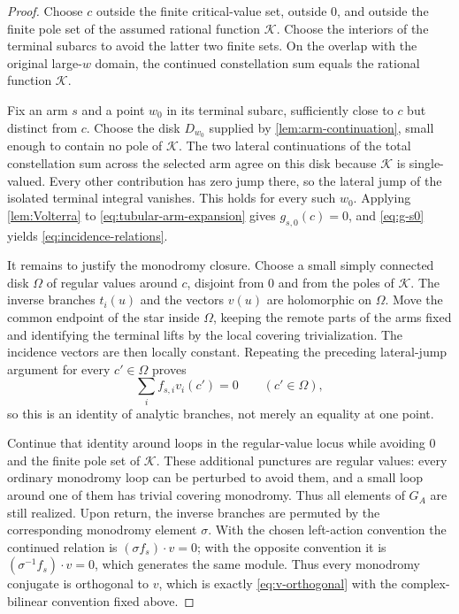 \documentclass[11pt]{article}
\numberwithin{equation}{section}
\theoremstyle{definition}
\theoremstyle{remark}
\newcommand{\Kcal}{\mathcal K}
\begin{document}
\begin{proof}
Choose $c$ outside the finite critical-value set, outside $0$, and outside
the finite pole set of the assumed rational function $\Kcal$.  Choose the
interiors of the terminal subarcs to avoid the latter two finite sets.  On
the overlap with the original large-$w$ domain, the continued constellation
sum equals the rational function $\Kcal$.

Fix an arm $s$ and a point $w_0$ in its terminal subarc, sufficiently close
to $c$ but distinct from $c$.  Choose the disk $D_{w_0}$ supplied by
\cref{lem:arm-continuation}, small enough to contain no pole of $\Kcal$.
The two lateral continuations of the total constellation sum across the
selected arm agree on this disk because $\Kcal$ is single-valued.  Every
other contribution has zero jump there, so the lateral jump of the isolated
terminal integral vanishes.  This holds for every such $w_0$.  Applying
\cref{lem:Volterra} to \eqref{eq:tubular-arm-expansion} gives
$g_{s,0}(c)=0$, and \eqref{eq:g-s0} yields
\eqref{eq:incidence-relations}.

It remains to justify the monodromy closure.  Choose a small simply
connected disk $\Omega$ of regular values around $c$, disjoint from $0$ and
from the poles of $\Kcal$.  The inverse branches $t_i(u)$ and the vectors
$v(u)$ are holomorphic on $\Omega$.  Move the common endpoint of the star
inside $\Omega$, keeping the remote parts of the arms fixed and identifying
the terminal lifts by the local covering trivialization.  The incidence
vectors are then locally constant.  Repeating the preceding lateral-jump
argument for every $c'\in\Omega$ proves
\[
  \sum_i f_{s,i}v_i(c')=0
  \qquad(c'\in\Omega),
\]
so this is an identity of analytic branches, not merely an equality at one
point.

Continue that identity around loops in the regular-value locus while
avoiding $0$ and the finite pole set of $\Kcal$.  These additional punctures
are regular values: every ordinary monodromy loop can be perturbed to avoid
them, and a small loop around one of them has trivial covering monodromy.
Thus all elements of $G_A$ are still realized.  Upon return, the inverse
branches are permuted by the corresponding monodromy element $\sigma$.
With the chosen left-action convention the continued relation is
$(\sigma f_s)\cdot v=0$; with the opposite convention it is
$(\sigma^{-1}f_s)\cdot v=0$, which generates the same module.  Thus every
monodromy conjugate is orthogonal to $v$, which is exactly
\eqref{eq:v-orthogonal} with the complex-bilinear convention fixed above.
\end{proof}
\end{document}
